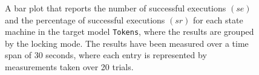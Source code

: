 \begin{figure}[h!]
\centering
\begin{minipage}{1\textwidth}
  \centering
  \makebox[\textwidth][c]{ %
        \resizebox{1.19\textwidth}{!}{ %
            
        }%
    }%
\end{minipage}
\caption{A bar plot that reports the number of successful executions $(se)$ and the percentage of successful executions $(sr)$ for each state machine in the target model \texttt{Tokens}, where the results are grouped by the locking mode. The results have been measured over a time span of 30 seconds, where each entry is represented by measurements taken over 20 trials.}
\label{figure:locking_mode_state_machine_transition_frequency_comparison_tokens}
\end{figure}